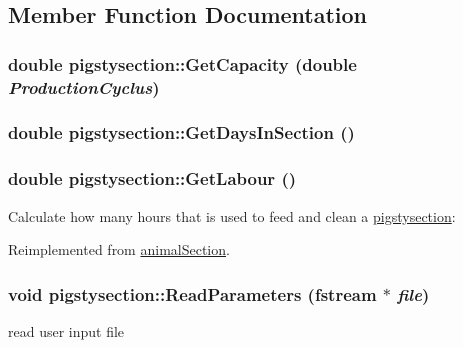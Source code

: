 \subsection{Member Function Documentation}
\hypertarget{classpigstysection_ae1edf71bb393463a034049cbf33b92c5}{
\subsubsection[{GetCapacity}]{\setlength{\rightskip}{0pt plus 5cm}double pigstysection::GetCapacity (double {\em ProductionCyclus})}}
\label{classpigstysection_ae1edf71bb393463a034049cbf33b92c5}
\hypertarget{classpigstysection_a1f373e9d4c4b75379502baebd97fe62d}{
\subsubsection[{GetDaysInSection}]{\setlength{\rightskip}{0pt plus 5cm}double pigstysection::GetDaysInSection ()}}
\label{classpigstysection_a1f373e9d4c4b75379502baebd97fe62d}
\hypertarget{classpigstysection_a1a6111cae83f84e265366223576617c1}{
\subsubsection[{GetLabour}]{\setlength{\rightskip}{0pt plus 5cm}double pigstysection::GetLabour ()}}
\label{classpigstysection_a1a6111cae83f84e265366223576617c1}
Calculate how many hours that is used to feed and clean a \hyperlink{classpigstysection}{pigstysection}: 

Reimplemented from \hyperlink{classanimal_section_acbe4ee2baee5364b2dbada0196449ebe}{animalSection}.\hypertarget{classpigstysection_acce45c15afb18b52d83a351643d03b57}{
\subsubsection[{ReadParameters}]{\setlength{\rightskip}{0pt plus 5cm}void pigstysection::ReadParameters (fstream $\ast$ {\em file})}}
\label{classpigstysection_acce45c15afb18b52d83a351643d03b57}
read user input file 

